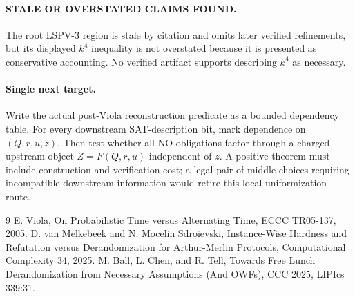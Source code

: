 \documentclass[11pt]{article}
\begin{document}
\paragraph{STALE OR OVERSTATED CLAIMS FOUND.}
The root LSPV-3 region is stale by citation and omits later verified refinements, but its displayed $k^4$ inequality is not overstated because it is presented as conservative accounting. No verified artifact supports describing $k^4$ as necessary.

\paragraph{Single next target.}
Write the actual post-Viola reconstruction predicate as a bounded dependency table. For every downstream SAT-description bit, mark dependence on $(Q,r,u,z)$. Then test whether all NO obligations factor through a charged upstream object $Z=F(Q,r,u)$ independent of $z$. A positive theorem must include construction and verification cost; a legal pair of middle choices requiring incompatible downstream information would retire this local uniformization route.

\begin{thebibliography}{9}
 E. Viola, On Probabilistic Time versus Alternating Time, ECCC TR05-137, 2005.
 D. van Melkebeek and N. Mocelin Sdroievski, Instance-Wise Hardness and Refutation versus Derandomization for Arthur-Merlin Protocols, Computational Complexity 34, 2025.
 M. Ball, L. Chen, and R. Tell, Towards Free Lunch Derandomization from Necessary Assumptions (And OWFs), CCC 2025, LIPIcs 339:31.
\end{thebibliography}
\end{document}
